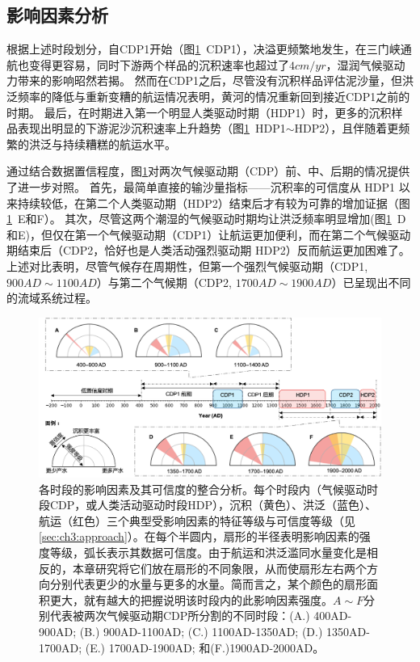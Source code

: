 \subsection{影响因素分析}

根据上述时段划分，自CDP1开始（图\ref{fig:ch3:impacts}~CDP1），决溢更频繁地发生，在三门峡通航也变得更容易，同时下游两个样品的沉积速率也超过了$4cm/yr$，湿润气候驱动力带来的影响昭然若揭。
然而在CDP1之后，尽管没有沉积样品评估泥沙量，但洪泛频率的降低与重新变糟的航运情况表明，黄河的情况重新回到接近CDP1之前的时期。
最后，在时期进入第一个明显人类驱动时期（HDP1）时，更多的沉积样品表现出明显的下游泥沙沉积速率上升趋势（图\ref{fig:ch3:impacts}~HDP1$\sim$HDP2），且伴随着更频繁的洪泛与持续糟糕的航运水平。


通过结合数据置信程度，图\ref{fig:ch3:impacts}对两次气候驱动期（CDP）前、中、后期的情况提供了进一步对照。
首先，最简单直接的输沙量指标——沉积率的可信度从 HDP1 以来持续较低，在第二个人类驱动期（HDP2）结束后才有较为可靠的增加证据（图\ref{fig:ch3:impacts}~E和F）。
其次，尽管这两个潮湿的气候驱动时期均让洪泛频率明显增加(图\ref{fig:ch3:impacts}~D和E)，但仅在第一个气候驱动期（CDP1）让航运更加便利，而在第二个气候驱动期结束后（CDP2，恰好也是人类活动强烈驱动期 HDP2）反而航运更加困难了。
上述对比表明，尽管气候存在周期性，但第一个强烈气候驱动期（CDP1, $900AD\sim1100AD$）与第二个气候期（CDP2, $1700AD\sim1900AD$）已呈现出不同的流域系统过程。

\begin{figure}[htb] %
    \includegraphics[width=\textwidth]{img/ch3/ch3_impacts.png}
    \caption[各时段的影响因素及其可信度的整合分析。]{各时段的影响因素及其可信度的整合分析。每个时段内（气候驱动时段CDP，或人类活动驱动时段HDP），沉积（黄色）、洪泛（蓝色）、航运（红色）三个典型受影响因素的特征等级与可信度等级（见\ref{sec:ch3:approach}）。在每个半圆内，扇形的半径表明影响因素的强度等级，弧长表示其数据可信度。由于航运和洪泛滥同水量变化是相反的，本章研究将它们放在扇形的不同象限，从而使扇形左右两个方向分别代表更少的水量与更多的水量。简而言之，某个颜色的扇形面积更大，就有越大的把握说明该时段内的此影响因素强度。$A \sim F$分别代表被两次气候驱动期CDP所分割的不同时段：(A.) 400AD-900AD; (B.) 900AD-1100AD; (C.) 1100AD-1350AD; (D.) 1350AD-1700AD; (E.) 1700AD-1900AD; 和(F.)1900AD-2000AD。}\label{fig:ch3:impacts}
\end{figure}

